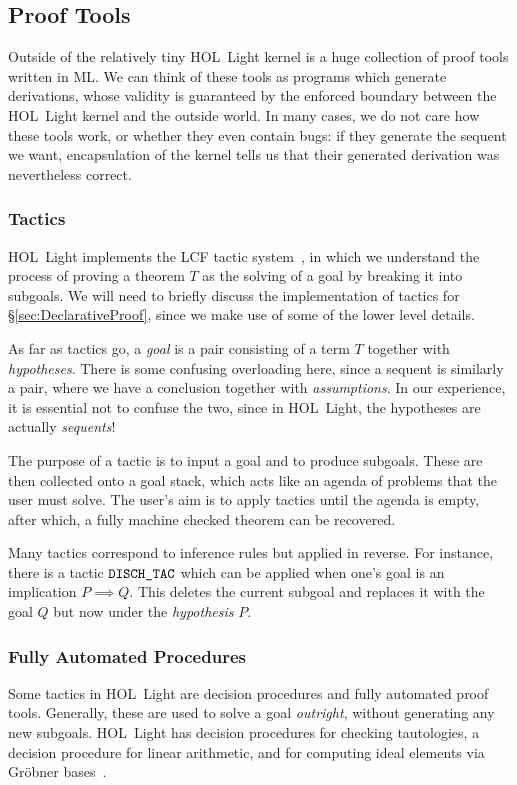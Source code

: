 \subsection{Proof Tools}
Outside of the relatively tiny HOL~Light kernel is a huge collection of proof tools written in ML. We can think of these tools as programs which generate derivations, whose validity is guaranteed by the enforced boundary between the HOL~Light kernel and the outside world. In many cases, we do not care how these tools work, or whether they even contain bugs: if they generate the sequent we want, encapsulation of the kernel tells us that their generated derivation was nevertheless correct.

\subsubsection{Tactics}
HOL~Light implements the LCF tactic system~\cite{Tactics}, in which we understand the process of proving a theorem $T$ as the solving of a goal by breaking it into subgoals. We will need to briefly discuss the implementation of tactics for \S\ref{sec:DeclarativeProof}, since we make use of some of the lower level details.

As far as tactics go, a \emph{goal} is a pair consisting of a term $T$ together with \emph{hypotheses}. There is some confusing overloading here, since a sequent is similarly a pair, where we have a conclusion together with \emph{assumptions}. In our experience, it is essential not to confuse the two, since in HOL~Light, the hypotheses are actually \emph{sequents}!

The purpose of a tactic is to input a goal and to produce subgoals. These are then collected onto a goal stack, which acts like an agenda of problems that the user must solve. The user's aim is to apply tactics until the agenda is empty, after which, a fully machine checked theorem can be recovered.

Many tactics correspond to inference rules but applied in reverse. For instance, there is a tactic $\texttt{DISCH\_TAC}$ which can be applied when one's goal is an implication $P \implies Q$. This deletes the current subgoal and replaces it with the goal $Q$ but now under the \emph{hypothesis} $P$.

\subsubsection{Fully Automated Procedures}
Some tactics in HOL~Light are decision procedures and fully automated proof tools. Generally, these are used to solve a goal \emph{outright}, without generating any new subgoals. HOL~Light has decision procedures for checking tautologies, a decision procedure for linear arithmetic, and for computing ideal elements via Gr\"{o}bner bases~\cite{BuchbergerGrobner}. 

